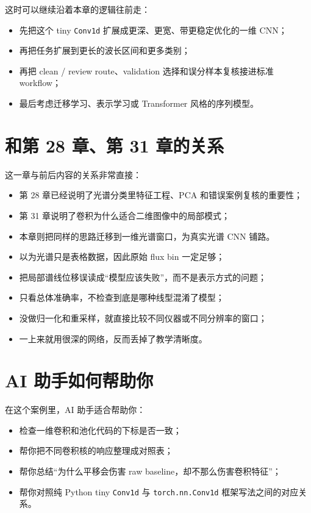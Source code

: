 这时可以继续沿着本章的逻辑往前走：

\begin{itemize}
    \item 先把这个 tiny \texttt{Conv1d} 扩展成更深、更宽、带更稳定优化的一维 CNN；
    \item 再把任务扩展到更长的波长区间和更多类别；
    \item 再把 clean / review route、validation 选择和误分样本复核接进标准 workflow；
    \item 最后考虑迁移学习、表示学习或 Transformer 风格的序列模型。
\end{itemize}

\section{和第 28 章、第 31 章的关系}

这一章与前后内容的关系非常直接：

\begin{itemize}
    \item 第 28 章已经说明了光谱分类里特征工程、PCA 和错误案例复核的重要性；
    \item 第 31 章说明了卷积为什么适合二维图像中的局部模式；
    \item 本章则把同样的思路迁移到一维光谱窗口，为真实光谱 CNN 铺路。
\end{itemize}

\begin{warnbox}[一维卷积入门中的常见误区]
\begin{itemize}
    \item 以为光谱只是表格数据，因此原始 flux bin 一定足够；
    \item 把局部谱线位移误读成“模型应该失败”，而不是表示方式的问题；
    \item 只看总体准确率，不检查到底是哪种线型混淆了模型；
    \item 没做归一化和重采样，就直接比较不同仪器或不同分辨率的窗口；
    \item 一上来就用很深的网络，反而丢掉了教学清晰度。
\end{itemize}
\end{warnbox}

\section{AI 助手如何帮助你}

在这个案例里，AI 助手适合帮助你：

\begin{itemize}
    \item 检查一维卷积和池化代码的下标是否一致；
    \item 帮你把不同卷积核的响应整理成对照表；
    \item 帮你总结“为什么平移会伤害 raw baseline，却不那么伤害卷积特征”；
    \item 帮你对照纯 Python tiny \texttt{Conv1d} 与 \texttt{torch.nn.Conv1d} 框架写法之间的对应关系。
\end{itemize}

